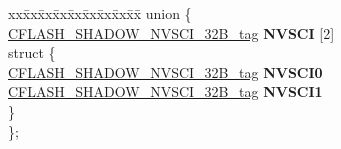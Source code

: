 \begin{DoxyCompactItemize}
\begin{tabbing}
\end{tabbing}\item 
\mbox{\label{structCFLASH__SHADOW__struct__tag_ac1fab772a74e196c3a96f6814f4fddbc}} 
\begin{tabbing}
xx\=xx\=xx\=xx\=xx\=xx\=xx\=xx\=xx\=\kill
union \{\\
\>\mbox{\hyperlink{unionCFLASH__SHADOW__NVSCI__32B__tag}{CFLASH\_SHADOW\_NVSCI\_32B\_tag}} {\bfseries NVSCI} \mbox{[}2\mbox{]}\\
\mbox{\label{unionCFLASH__SHADOW__struct__tag_1_1_0D1479_a97541812d6f8f91846a977a141159e6f}} 
\>struct \{\\
\>\>\mbox{\hyperlink{unionCFLASH__SHADOW__NVSCI__32B__tag}{CFLASH\_SHADOW\_NVSCI\_32B\_tag}} {\bfseries NVSCI0}\\
\>\>\mbox{\hyperlink{unionCFLASH__SHADOW__NVSCI__32B__tag}{CFLASH\_SHADOW\_NVSCI\_32B\_tag}} {\bfseries NVSCI1}\\
\>\} \\
\}; \\


\end{tabbing}
\end{DoxyCompactItemize}
